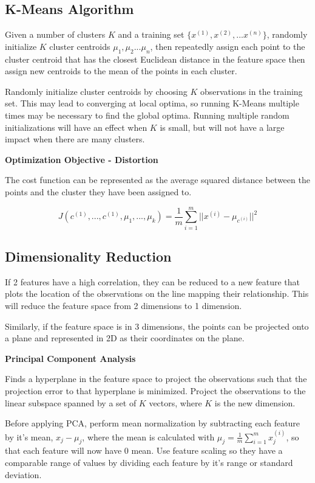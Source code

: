 \documentclass[
]{article}
\author{}
\date{}
\begin{document}
\hypertarget{header-n0}{%
\subsection{K-Means Algorithm}\label{header-n0}}

Given a number of clusters \(K\) and a training set
\(\{x^{(1)}, x^{(2)}, ... x^{(n)}\}\), randomly initialize \(K\) cluster
centroids \(\mu_1,\mu_2...\mu_n\), then repeatedly assign each point to
the cluster centroid that has the closest Euclidean distance in the
feature space then assign new centroids to the mean of the points in
each cluster.

Randomly initialize cluster centroids by choosing \(K\) observations in
the training set. This may lead to converging at local optima, so
running K-Means multiple times may be necessary to find the global
optima. Running multiple random initializations will have an effect when
\(K\) is small, but will not have a large impact when there are many
clusters.

\textbf{Optimization Objective - Distortion}

The cost function can be represented as the average squared distance
between the points and the cluster they have been assigned to.

\[J(c^{(1)}, ..., c^{(1)},\mu_1,...,\mu_k) = \frac{1}{m}\sum^m_{i=1}||x^{(i)}-\mu_{c^{(i)}}||^2\]

\hypertarget{header-n7}{%
\subsection{Dimensionality Reduction}\label{header-n7}}

If 2 features have a high correlation, they can be reduced to a new
feature that plots the location of the observations on the line mapping
their relationship. This will reduce the feature space from 2 dimensions
to 1 dimension.

Similarly, if the feature space is in 3 dimensions, the points can be
projected onto a plane and represented in 2D as their coordinates on the
plane.

\textbf{Principal Component Analysis}

Finds a hyperplane in the feature space to project the observations such
that the projection error to that hyperplane is minimized. Project the
observations to the linear subspace spanned by a set of \(K\) vectors,
where \(K\) is the new dimension.

Before applying PCA, perform mean normalization by subtracting each
feature by it's mean, \(x_j - \mu_j\), where the mean is calculated with
\(\mu_j = \frac{1}{m}\sum^m_{i=1}x_j^{(i)}\), so that each feature will
now have \(0\) mean. Use feature scaling so they have a comparable range
of values by dividing each feature by it's range or standard deviation.
\end{document}
